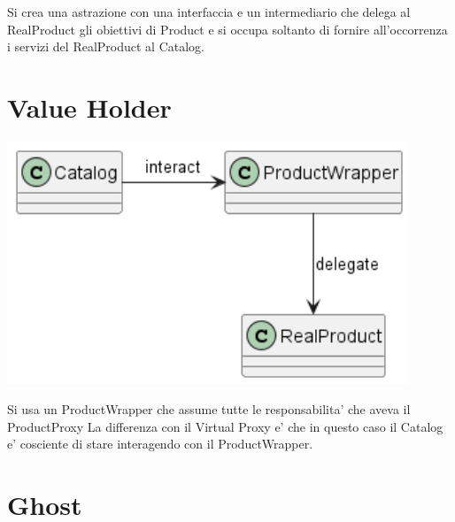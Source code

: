 Si crea una astrazione con una interfaccia e un intermediario che delega al RealProduct gli obiettivi di Product e si occupa soltanto di fornire all'occorrenza i servizi del RealProduct al Catalog.

\section{Value Holder}

\begin{center}
    \includegraphics[width=12cm]{images/lazy-load/ValueHolder.png}
\end{center}

Si usa un ProductWrapper che assume tutte le responsabilita' che aveva il ProductProxy
La differenza con il Virtual Proxy e' che in questo caso il Catalog e' cosciente di stare interagendo con il ProductWrapper.

\section{Ghost}

